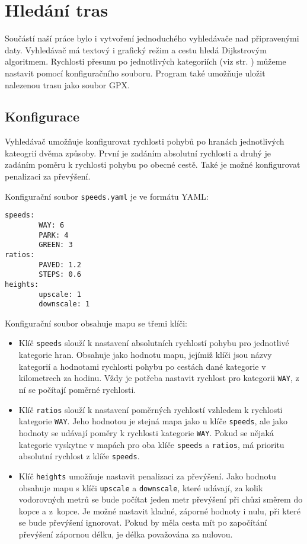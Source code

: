 \chapter{Hledání tras}
Součástí naší práce bylo i vytvoření jednoduchého vyhledávače nad připravenými
daty. Vyhledávač má textový i grafický režim a cestu hledá Dijkstrovým
algoritmem. Rychlosti přesunu po jednotlivých kategoriích (viz str.
\pageref{label:kategorie}) můžeme nastavit pomocí konfiguračního souboru.
Program také umožňuje uložit nalezenou trasu jako soubor GPX. \cite{gpxspec}  

\section{Konfigurace}
Vyhledávač umožňuje konfigurovat rychlosti pohybů po hranách jednotlivých
kateogrií dvěma způsoby. První je zadáním absolutní rychlosti a druhý je zadáním
poměru k rychlosti pohybu po obecné cestě. Také je možné konfigurovat penalizaci
za převýšení.

Konfigurační soubor \verb|speeds.yaml| je ve formátu YAML: \cite{yamlspec} 
\begin{verbatim}
speeds:
        WAY: 6
        PARK: 4
        GREEN: 3
ratios:
        PAVED: 1.2
        STEPS: 0.6
heights:
        upscale: 1
        downscale: 1
\end{verbatim}
Konfigurační soubor obsahuje mapu se třemi klíči:
\begin{itemize}
	\item Klíč \verb|speeds| slouží k nastavení absolutních rychlostí pohybu
	pro jednotlivé kategorie hran. Obsahuje jako hodnotu mapu, jejímiž klíči jsou
	názvy kategorií a hodnotami rychlosti pohybu po cestách dané kategorie v
	kilometrech za hodinu. Vždy je potřeba nastavit rychlost pro kategorii
	\verb|WAY|, z ní se počítají poměrné rychlosti.
	\item Klíč \verb|ratios| slouží k nastavení poměrných rychlostí vzhledem
	k rychlosti kategorie \verb|WAY|. Jeho hodnotou je stejná mapa jako u
	klíče \verb|speeds|, ale jako hodnoty se udávají poměry k rychlosti
	kategorie \verb|WAY|. Pokud se nějaká kategorie vyskytne v mapách pro
	oba klíče \verb|speeds| a \verb|ratios|, má prioritu absolutní rychlost
	z klíče \verb|speeds|.
	\item Klíč \verb|heights| umožňuje nastavit penalizaci za převýšení.
	Jako hodnotu obsahuje mapu s klíči \verb|upscale| a \verb|downscale|,
	které udávají, za kolik vodorovných metrů se bude počítat jeden metr
	převýšení při chůzi směrem do kopce a z~kopce. Je možné nastavit kladné,
	záporné hodnoty i nulu, při které se bude převýšení ignorovat. Pokud by
	měla cesta mít po započítání převýšení zápornou délku, je délka
	považována za nulovou.
\end{itemize}

